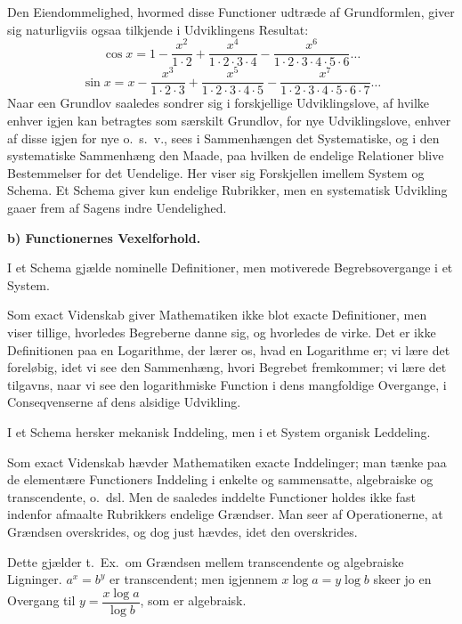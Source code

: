 \documentclass[12pt]{book}
\newcommand{\opage}[1]{\marginnote{\footnotesize\textit{[#1]}}}
\begin{document}
\opage{34} Den Eiendommelighed, hvormed disse Functioner udtræde af Grundformlen, giver sig
naturligviis ogsaa tilkjende i Udviklingens Resultat:
\[
\cos x = 1 - \frac{x^{2}}{1\cdot 2} + \frac{x^{4}}{1\cdot 2\cdot 3\cdot 4}
- \frac{x^{6}}{1\cdot 2\cdot 3\cdot 4\cdot 5\cdot 6}\dots
\]
\[
\sin x = x - \frac{x^{3}}{1\cdot 2\cdot 3} + \frac{x^{5}}{1\cdot 2\cdot 3\cdot
4\cdot 5} - \frac{x^{7}}{1\cdot 2\cdot 3\cdot 4\cdot 5\cdot 6\cdot 7}\dots
\]
Naar een Grundlov saaledes sondrer sig i forskjellige Udviklingslove, af hvilke
enhver igjen kan betragtes som særskilt Grundlov, for nye Udviklingslove, enhver
af disse igjen
\opage{35} for nye o.\ s.\ v., sees i Sammenhængen det Systematiske, og i den systematiske
Sammenhæng den Maade, paa hvilken de endelige Relationer blive Bestemmelser for
det Uendelige. Her viser sig Forskjellen imellem System og Schema. Et Schema
giver kun endelige Rubrikker, men en systematisk Udvikling gaaer frem af Sagens
indre Uendelighed.

\begin{center}
\textbf{b) Functionernes Vexelforhold.}
\end{center}
{}

I et Schema gjælde nominelle Definitioner, men motiverede Begrebsovergange i et
System.

Som exact Videnskab giver Mathematiken ikke blot exacte Definitioner, men viser
tillige, hvorledes Begreberne danne sig, og hvorledes de virke. Det er ikke
Definitionen paa en Logarithme, der lærer os, hvad en Logarithme er; vi lære det
foreløbig, idet vi see den Sammenhæng, hvori Begrebet fremkommer; vi lære det
tilgavns, naar vi see den logarithmiske Function i dens mangfoldige Overgange, i
Conseqvenserne af dens alsidige Udvikling.

I et Schema hersker mekanisk Inddeling, men i et System organisk Leddeling.

Som exact Videnskab hævder Mathematiken exacte Inddelinger; man tænke paa de
elementære Functioners Inddeling i enkelte og sammensatte, algebraiske og
transcendente, o.\ dsl. Men de saaledes inddelte Functioner holdes ikke fast
indenfor afmaalte Rubrikkers endelige Grændser. Man seer af Operationerne, at
Grændsen overskrides, og dog just hævdes, idet den overskrides.

Dette gjælder t.\ Ex.\ om Grændsen mellem transcendente og algebraiske Ligninger.
$a^{x} = b^{y}$ er transcendent; men igjennem $x\log a = y\log b$ skeer jo en
Overgang til $y = \dfrac{x\log a}{\log b}$, som er algebraisk.
\end{document}
